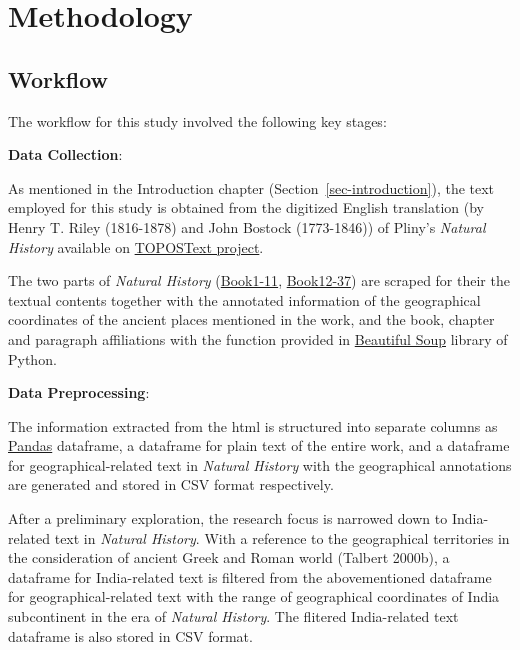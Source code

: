 \documentclass[
  12pt,
]{article}
\begin{document}
\hypertarget{sec-methodology}{%
\section{Methodology}\label{sec-methodology}}

\hypertarget{workflow}{%
\subsection{Workflow}\label{workflow}}

The workflow for this study involved the following key stages:

\textbf{Data Collection}:

As mentioned in the Introduction chapter
(Section~\ref{sec-introduction}), the text employed for this study is
obtained from the digitized English translation (by Henry T. Riley
(1816-1878) and John Bostock (1773-1846)) of Pliny's \emph{Natural
History} available on \href{https://topostext.org/the-project}{TOPOSText
project}.

The two parts of \emph{Natural History}
(\href{https://topostext.org/work/148}{Book1-11},
\href{https://topostext.org/work/153}{Book12-37}) are scraped for their
the textual contents together with the annotated information of the
geographical coordinates of the ancient places mentioned in the work,
and the book, chapter and paragraph affiliations with the function
provided in
\href{https://www.crummy.com/software/BeautifulSoup/bs4/doc/}{Beautiful
Soup} library of Python.

\textbf{Data Preprocessing}:

The information extracted from the html is structured into separate
columns as \href{https://pandas.pydata.org/}{Pandas} dataframe, a
dataframe for plain text of the entire work, and a dataframe for
geographical-related text in \emph{Natural History} with the
geographical annotations are generated and stored in CSV format
respectively.

After a preliminary exploration, the research focus is narrowed down to
India-related text in \emph{Natural History}. With a reference to the
geographical territories in the consideration of ancient Greek and Roman
world (Talbert 2000b), a dataframe for India-related text is filtered
from the abovementioned dataframe for geographical-related text with the
range of geographical coordinates of India subcontinent in the era of
\emph{Natural History}. The flitered India-related text dataframe is
also stored in CSV format.
\end{document}
